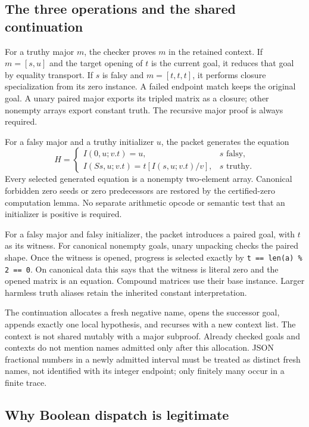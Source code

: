 \documentclass[11pt,letterpaper]{article}
\theoremstyle{definition}\newtheorem{definition}[theorem]{Definition}
\theoremstyle{remark}\newtheorem{remark}[theorem]{Remark}
\begin{document}
\subsection{The three operations and the shared continuation}

For a truthy major $m$, the checker proves $m$ in the retained context.
If $m=[s,u]$ and the target opening of $t$ is the current goal, it
reduces that goal by equality transport. If $s$ is falsy and
$m=[t,t,t]$, it performs closure specialization from its zero instance.
A failed endpoint match keeps the original goal. A unary paired major
exports its tripled matrix as a closure; other nonempty arrays export
constant truth. The recursive major proof is always required.

For a falsy major and a truthy initializer $u$, the packet generates
the equation
\[
 H=\begin{cases}
 I(0,u;v.t)=u,&s\text{ falsy},\\
 I(Ss,u;v.t)=t[I(s,u;v.t)/v],&s\text{ truthy}.
 \end{cases}
\]
Every selected generated equation is a nonempty two-element array.
Canonical forbidden zero seeds or zero predecessors are restored by
the certified-zero computation lemma. No separate arithmetic opcode
or semantic test that an initializer is positive is required.

For a falsy major and falsy initializer, the packet introduces a paired
goal, with $t$ as its witness. For canonical nonempty goals, unary
unpacking checks the paired shape. Once the witness is opened, progress is selected exactly by
\texttt{t == len(a) \% 2 == 0}. On canonical data this says that the
witness is literal zero and the opened matrix is an equation. Compound
matrices use their base instance. Larger harmless truth aliases retain
the inherited constant interpretation.

The continuation allocates a fresh negative name, opens the successor
goal, appends exactly one local hypothesis, and recurses with a new
context list. The context is not shared mutably with a major subproof.
Already checked goals and contexts do not mention names admitted only
after this allocation. JSON fractional numbers in a newly admitted
interval must be treated as distinct fresh names, not identified with
its integer endpoint; only finitely many occur in a finite trace.

\subsection{Why Boolean dispatch is legitimate}
\end{document}

